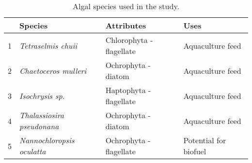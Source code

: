 \begin{table}[ht]
\centering
\begin{tabular}{rlll}
  \hline
 & Species & Attributes & Uses \\ 
  \hline
1 & \emph{Tetraselmis chuii} & Chlorophyta - flagellate & Aquaculture feed \\ 
  2 & \emph{Chaetoceros mulleri} & Ochrophyta - diatom & Aquaculture feed \\ 
  3 & \emph{Isochrysis sp.} & Haptophyta - flagellate & Aquaculture feed \\ 
  4 & \emph{Thalassiosira pseudonana} & Ochrophyta - diatom & Aquaculture feed \\ 
  5 & \emph{Nannochloropsis oculatta} & Ochrophyta - flagellate & Potential for biofuel \\ 
   \hline
\end{tabular}
\caption{Algal species used in the study.} 
\label{tab:Algae_Species}
\end{table}
